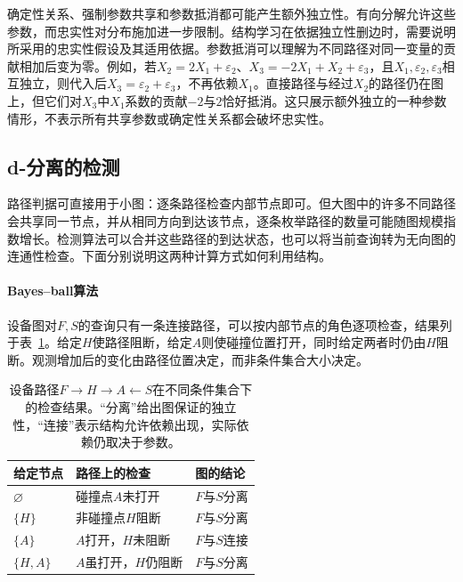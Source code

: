 确定性关系、强制参数共享和参数抵消都可能产生额外独立性。有向分解允许这些参数，而忠实性对分布施加进一步限制。结构学习在依据独立性删边时，需要说明所采用的忠实性假设及其适用依据。参数抵消可以理解为不同路径对同一变量的贡献相加后变为零。例如，若$X_2=2X_1+\varepsilon_2$、$X_3=-2X_1+X_2+\varepsilon_3$，且$X_1,\varepsilon_2,\varepsilon_3$相互独立，则代入后$X_3=\varepsilon_2+\varepsilon_3$，不再依赖$X_1$。直接路径与经过$X_2$的路径仍在图上，但它们对$X_3$中$X_1$系数的贡献$-2$与$2$恰好抵消。这只展示额外独立的一种参数情形，不表示所有共享参数或确定性关系都会破坏忠实性。

\subsection{d-分离的检测}
\label{sec:pgm-directed-d-separation-testing}

路径判据可直接用于小图：逐条路径检查内部节点即可。但大图中的许多不同路径会共享同一节点，并从相同方向到达该节点，逐条枚举路径的数量可能随图规模指数增长。检测算法可以合并这些路径的到达状态，也可以将当前查询转为无向图的连通性检查。下面分别说明这两种计算方式如何利用结构。

\begingroup
\let\subsubsection\paragraph

\subsubsection{Bayes--ball算法}
\label{sec:pgm-directed-bayes-ball}

设备图对$F,S$的查询只有一条连接路径，可以按内部节点的角色逐项检查，结果列于表~\ref{tab:pgm-directed-path-tests}。给定$H$使路径阻断，给定$A$则使碰撞位置打开，同时给定两者时仍由$H$阻断。观测增加后的变化由路径位置决定，而非条件集合大小决定。

\begin{table}[htbp]
  \centering
  \begin{tabularx}{\linewidth}{@{}lXX@{}}
    \toprule
    给定节点 & 路径上的检查 & 图的结论 \\
    \midrule
    $\varnothing$ & 碰撞点$A$未打开 & $F$与$S$分离 \\
    $\{H\}$ & 非碰撞点$H$阻断 & $F$与$S$分离 \\
    $\{A\}$ & $A$打开，$H$未阻断 & $F$与$S$连接 \\
    $\{H,A\}$ & $A$虽打开，$H$仍阻断 & $F$与$S$分离 \\
    \bottomrule
  \end{tabularx}
  \caption{设备路径$F\to H\to A\leftarrow S$在不同条件集合下的检查结果。“分离”给出图保证的独立性，“连接”表示结构允许依赖出现，实际依赖仍取决于参数。}
  \label{tab:pgm-directed-path-tests}
\end{table}
\FloatBarrier

